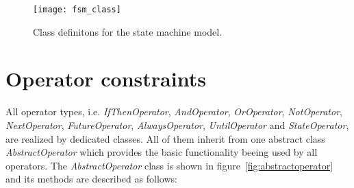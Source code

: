 \begin{figure}[htbp]
  \centering
  \texttt{[image: fsm\_class]} 
  \caption{Class definitons for the state machine model.}
  \label{fig:fsm_class}
\end{figure}




\section{Operator constraints}
\label{sec:prototype:operatorconstraints}

All operator types, i.e. \emph{IfThenOperator}, \emph{AndOperator}, \emph{OrOperator}, \emph{NotOperator}, \emph{NextOperator}, \emph{FutureOperator}, \emph{AlwaysOperator}, \emph{UntilOperator} and \emph{StateOperator}, are realized by dedicated classes. All of them inherit from one abstract class \emph{AbstractOperator} which provides the basic functionality beeing used by all operators. The \emph{AbstractOperator} class is shown in figure~\ref{fig:abstractoperator} and its methods are described as follows:

